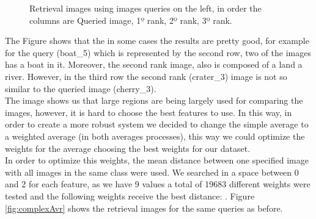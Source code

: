 \documentclass[12pt,a4paper]{article}
\begin{document}
\begin{figure}[!h]
{{		}
	}
	\enskip
	{
		{
			\setlength{\fboxsep}{1pt}
			\setlength{\fboxrule}{1pt}
		}
	}
	
		
	\caption{Retrieval images using images queries on the left, in order the columns are Queried image, 1º rank, 2º rank, 3º rank.}
	\label{fig:simpleAvr}
\end{figure}

The Figure shows that the in some cases the results are pretty good, for example for the query (boat\_5) which is represented by the second row, two of the images has a boat in it. Moreover, the second rank image, also is composed of a land a river. However, in the third row the second rank (crater\_3) image is not so similar to the queried image (cherry\_3). \\ 

The image shows us that large regions are being largely used for comparing the images, however, it is hard to choose the best features to use. In this way, in order to create a more robust system we decided to change the simple average to a weighted average (in both averages processes), this way we could optimize the weights for the average choosing the best weights for our dataset. \\

In order to optimize this weights, the mean distance between one specified image with all images in the same class were used. We searched in a space between 0 and 2 for each feature, as we have 9 values a total of 19683 different weights were tested and the following weights receive the best distance: . Figure \ref{fig:complexAvr} shows the retrieval images for the same queries as before.
\end{document}

